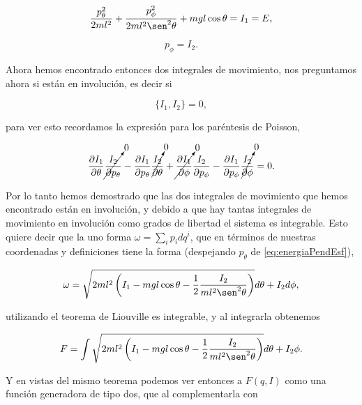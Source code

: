 \documentclass[a4paper,10pt]{article}
\numberwithin{equation}{section}
\begin{document}
\begin{equation}
  \frac{p_\theta^2}{2ml^2} + \frac{p_\phi^2}{2ml^2\sen^2{\theta}} 
 + mgl\cos{\theta} = I_1 = E,
 \label{eq:energiaPendEsf}
\end{equation}

\begin{equation}
 p_\phi = I_2.
 \label{eq:pphiPendEsf}
\end{equation}

Ahora hemos encontrado entonces dos integrales de movimiento, nos preguntamos ahora 
si están en involución, es decir si 

\begin{equation}
 \{I_1, I_2\} = 0,
\end{equation}

para ver esto recordamos la expresión para los paréntesis de Poisson, 

\begin{equation}
 \frac{\partial I_1}{\partial \theta}\cancelto{0}{\frac{I_2}{\partial p_\theta}} 
 - \frac{\partial I_1}{\partial p_\theta}\cancelto{0}{\frac{I_2}{\partial \theta}} + 
 \cancelto{0}{\frac{\partial I_1}{\partial \phi}}\frac{I_2}{\partial p_\phi} 
 - \frac{\partial I_1}{\partial p_\phi}\cancelto{0}{\frac{I_2}{\partial \phi}} = 
 0.
\end{equation}

Por lo tanto hemos demostrado que las dos integrales de movimiento que hemos encontrado 
están en involución, y debido a que hay tantas integrales de movimiento en involución como grados 
de libertad el sistema es integrable. Esto quiere decir que la uno forma $\omega = 
\sum_i p_idq^i$, que en términos de nuestras coordenadas y definiciones tiene la 
forma (despejando $p_\theta$ de \eqref{eq:energiaPendEsf}),

\begin{equation}
 \omega = \sqrt{2ml^2\left(I_1 - mgl\cos{\theta} - \frac{1}{2}\frac{I_2}{ml^2\sen^2{\theta}}
 \right)}d\theta + I_2d\phi,
\end{equation}

utilizando el teorema de Liouville es integrable, y al integrarla obtenemos 

\begin{equation}
 F = \int \sqrt{2ml^2\left(I_1 - mgl\cos{\theta} - \frac{1}{2}\frac{I_2}{ml^2\sen^2{\theta}}
 \right)}d\theta + I_2\phi.
\end{equation}

Y en vistas del mismo teorema podemos ver entonces a $F(q,I)$ como una función 
generadora de tipo dos, que al complementarla con 
\end{document}
